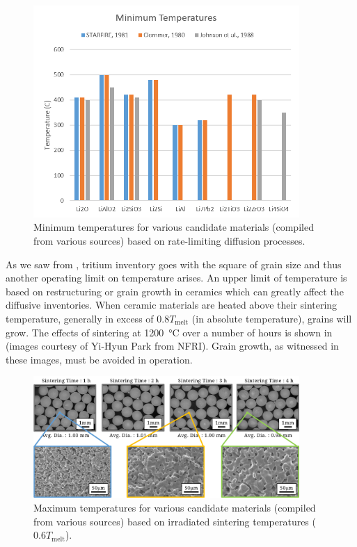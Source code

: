 \documentclass[11pt]{report} %
\begin{document}
\begin{figure}[ht]
	\centering
	\includegraphics[width=0.9\textwidth]{images/Tmin} 
	\caption{Minimum temperatures for various candidate materials (compiled from various sources) based on rate-limiting diffusion processes.}
	\label{fig:Tmin}
\end{figure}

As we saw from , tritium inventory goes with the square of grain size and thus another operating limit on temperature arises. An upper limit of temperature is based on restructuring or grain growth in ceramics which can greatly affect the diffusive inventories. When ceramic materials are heated above their sintering temperature, generally in excess of $0.8 T_\text{melt}$ (in absolute temperature), grains will grow. The effects of sintering at \SI{1200}{\celsius} over a number of hours is shown in  (images courtesy of Yi-Hyun Park from NFRI). Grain growth, as witnessed in these images, must be avoided in operation.

\begin{figure}[ht]
	\centering
	\includegraphics[width=0.9\textwidth]{images/material-production-NFRI} 
	\caption{Maximum temperatures for various candidate materials (compiled from various sources) based on irradiated sintering temperatures ($0.6T_\text{melt}$).}
	\label{fig:material-production-NFRI}
\end{figure}
\end{document}
